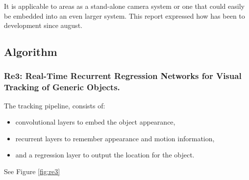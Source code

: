 \documentclass[a4paper]{article}
\begin{document}
It is applicable to areas as a stand-alone camera system or one that could easily be embedded into an even larger system. This report expressed how has been to development since august.


\subsection{Algorithm}
\subsubsection{Re3: Real-Time Recurrent Regression Networks for Visual Tracking of Generic Objects.}

The tracking pipeline, consists of:
\begin{itemize}
    \item convolutional layers to embed the object appearance, 
    \item recurrent layers to remember appearance and motion information, 
    \item and a regression layer to output the location for the object. 
\end{itemize}
See Figure \ref{fig:re3}
\end{document}
